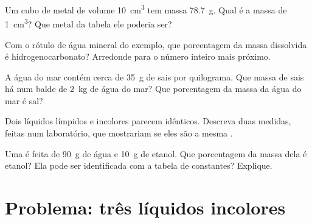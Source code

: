 \begin{exercise}[$\star\star$]\label{exo:g6:pure-substances-and-mixtures:8}
Um cubo de metal de volume \qty{10}{cm^3} tem massa \qty{78.7}{g}. Qual
é a massa de \qty{1}{cm^3}? Que metal da tabela ele poderia ser?
\end{exercise}

\begin{exercise}[$\star\star$]\label{exo:g6:pure-substances-and-mixtures:9}
Com o rótulo de água mineral do exemplo, que porcentagem da massa
dissolvida é hidrogenocarbonato? Arredonde para o número inteiro mais
próximo.
\end{exercise}

\begin{exercise}[$\star\star$]\label{exo:g6:pure-substances-and-mixtures:10}
A água do mar contém cerca de \qty{35}{g} de sais por quilograma. Que
massa de sais há num balde de \qty{2}{kg} de água do mar? Que
porcentagem da massa da água do mar é sal?
\end{exercise}

\begin{exercise}[$\star\star\star$]\label{exo:g6:pure-substances-and-mixtures:11}
Dois líquidos límpidos e incolores parecem idênticos. Descreva duas
medidas, feitas num laboratório, que mostrariam se eles são a mesma
.
\end{exercise}

\begin{exercise}[$\star\star\star$]\label{exo:g6:pure-substances-and-mixtures:12}
Uma  é feita de \qty{90}{g} de água e \qty{10}{g} de etanol. Que
porcentagem da massa dela é etanol? Ela pode ser identificada com a
tabela de constantes? Explique.
\end{exercise}

\section{Problema: três líquidos incolores}

